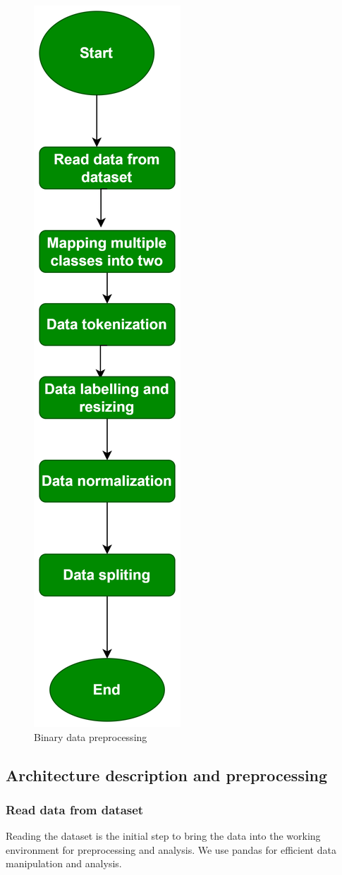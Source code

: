 \begin{figure}
    \centering
    \includegraphics[width=0.3\linewidth]{chap3/images/datapreprocessing binary.drawio.png}
    \caption{ Binary data preprocessing}
    \label{fig:enter-label}
\end{figure}


\newpage


\subsection{Architecture description and preprocessing}
\subsubsection{Read data from dataset}
Reading the dataset is the initial step to bring the data into the working environment for preprocessing and analysis. We use pandas for efficient data manipulation and analysis.
